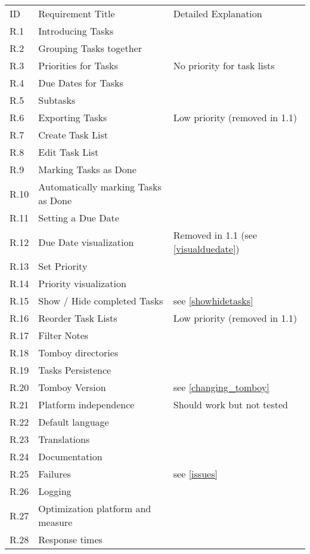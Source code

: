 \begin{tabular}{lll}
\rowcolor[gray]{0.9}
ID  & Requirement Title   & Detailed Explanation	\\
\completed	R.1		& Introducing Tasks   & 						\\
\completed	R.2		& Grouping Tasks together & \\
\parts		R.3		& Priorities for Tasks & No priority for task lists\\
\completed	R.4		& Due Dates for Tasks & \\
\completed	R.5		& Subtasks & \\
\notdone	R.6		& Exporting Tasks & Low priority (removed in 1.1)\\
\completed	R.7		& Create Task List & \\
\completed	R.8		& Edit Task List & \\
\completed	R.9		& Marking Tasks as Done & \\
\completed	R.10	& Automatically marking Tasks as Done & \\
\completed	R.11	& Setting a Due Date & \\
\notdone	R.12	& Due Date visualization & Removed in 1.1 (see \ref{visualduedate})\\
\completed	R.13	& Set Priority & \\
\completed	R.14	& Priority visualization & \\
\parts		R.15	& Show / Hide completed Tasks & see \ref{showhidetasks}\\
\notdone	R.16	& Reorder Task Lists & Low priority (removed in 1.1)\\
\completed	R.17	& Filter Notes & \\
\completed	R.18	& Tomboy directories & \\
\completed	R.19	& Tasks Persistence & \\
\notdone	R.20	& Tomboy Version & see \ref{changing_tomboy}\\
\parts		R.21	& Platform independence & Should work but not tested\\
\completed	R.22	& Default language & \\
\completed	R.23	& Translations & \\
\completed	R.24	& Documentation & \\
\parts		R.25	& Failures & see \ref{issues} \\
\completed	R.26	& Logging & \\
\completed	R.27	& Optimization platform and measure & \\
\completed	R.28	& Response times & \\

\end{tabular}
